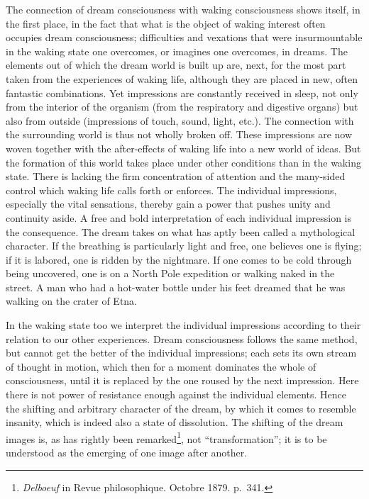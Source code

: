\documentclass[12pt,a4paper]{book}
\newcommand{\opage}[1]{\marginnote{\footnotesize\textit{[#1]}}}
\begin{document}
The connection of dream consciousness with waking consciousness shows
itself, in the first place, in the fact that what is the object of waking
interest often occupies dream consciousness; difficulties and vexations
that were insurmountable in the waking state one overcomes, or imagines
one overcomes, in dreams. The elements out of which the dream world is
built up are, next, for the most part taken from the experiences of
waking life, although they are placed in new, often fantastic
combinations. Yet impressions are constantly received in sleep, not only
from the interior of the organism (from the respiratory and digestive
organs) but also from outside (impressions of touch, sound, light, etc.).
The connection with the surrounding world is thus not wholly broken off.
These impressions are now woven together with the after-effects of waking
life into a new world of ideas. But the formation of this world takes
place under other conditions than in the waking state. There is lacking
the firm concentration of attention and the many-sided control which
waking life calls forth or enforces. The individual impressions,
especially the vital sensations, thereby gain a power that pushes unity
and continuity aside. A free and bold interpretation of each individual
impression is the consequence. The dream takes on what has aptly been
called a mythological character. If the breathing is particularly light
and free, one believes one is flying; if it is labored, one is ridden by
the nightmare. If one comes to be cold through being uncovered, one is on
a North Pole expedition or walking naked in the street. A man who had a
hot-water bottle under his feet dreamed that he was walking on the crater
of Etna.

In the waking state too we interpret the individual impressions according
to their relation to our other experiences. Dream consciousness follows
the same method, but cannot get the better
\opage{95}of the individual impressions; each sets its own stream of
thought in motion, which then for a moment dominates the whole of
consciousness, until it is replaced by the one roused by the next
impression. Here there is not power of resistance enough against the
individual elements. Hence the shifting and arbitrary character of the
dream, by which it comes to resemble insanity, which is indeed also a
state of dissolution. The shifting of the dream images is, as has
rightly been remarked\footnote{\emph{Delboeuf} in Revue philosophique.
Octobre 1879. p.~341.}, not ``transformation''; it is to be understood as
the emerging of one image after another.
\end{document}
